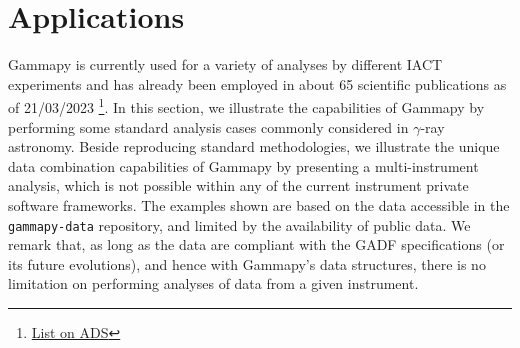 \documentclass[longauth]{aa}
\newcommand{\code}[1]{\texttt{#1}}
\newcommand{\gammapy}{Gammapy\xspace}
\newcommand{\gammaray}{$\gamma$-ray\xspace}
\begin{document}
\section{Applications}
\label{sec:applications}
\gammapy is currently used for a variety of analyses by different IACT
experiments and has already been employed in about 65 scientific publications as of 21/03/2023
\footnote{\href{https://ui.adsabs.harvard.edu/search/q=(\%20(citations(doi\%3A\%2210.1051\%2F0004-6361\%2F201834938\%22)\%20OR\%20citations(bibcode\%3A2017ICRC...35..766D))\%20AND\%20year\%3A2014-2023)&sort=date\%20desc\%2C\%20bibcode\%20desc&p_=0}{List on ADS}}.
In this section, we illustrate the capabilities of \gammapy by performing some standard
analysis cases commonly considered in \gammaray astronomy.
Beside reproducing standard methodologies, we illustrate the unique data combination
capabilities of \gammapy by presenting a multi-instrument analysis, which is not possible within any
of the current instrument private software frameworks.
The examples shown are based on the data accessible in the \code{gammapy-data} repository,
and limited by the availability of public data.
We remark that, as long as the data are compliant with the GADF specifications (or its future evolutions),
and hence with Gammapy's data structures, there is no limitation on performing
analyses of data from a given instrument.
\end{document}

